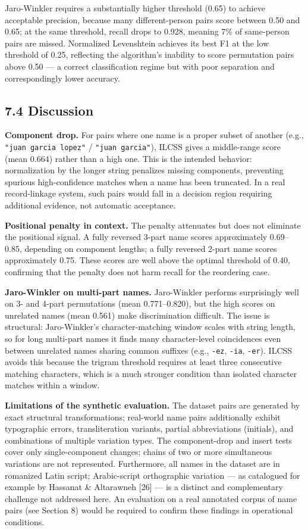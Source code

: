 \documentclass[
  11pt,
]{article}
\begin{document}
Jaro-Winkler requires a substantially higher threshold (0.65) to achieve
acceptable precision, because many different-person pairs score between
0.50 and 0.65; at the same threshold, recall drops to 0.928, meaning 7\%
of same-person pairs are missed. Normalized Levenshtein achieves its
best F1 at the low threshold of 0.25, reflecting the algorithm's
inability to score permutation pairs above 0.50 --- a correct
classification regime but with poor separation and correspondingly lower
accuracy.

\subsection{7.4 Discussion}\label{discussion}

\textbf{Component drop.} For pairs where one name is a proper subset of
another (e.g., \texttt{"juan\ garcia\ lopez"} /
\texttt{"juan\ garcia"}), ILCSS gives a middle-range score (mean 0.664)
rather than a high one. This is the intended behavior: normalization by
the longer string penalizes missing components, preventing spurious
high-confidence matches when a name has been truncated. In a real
record-linkage system, such pairs would fall in a decision region
requiring additional evidence, not automatic acceptance.

\textbf{Positional penalty in context.} The penalty attenuates but does
not eliminate the positional signal. A fully reversed 3-part name scores
approximately 0.69--0.85, depending on component lengths; a fully
reversed 2-part name scores approximately 0.75. These scores are well
above the optimal threshold of 0.40, confirming that the penalty does
not harm recall for the reordering case.

\textbf{Jaro-Winkler on multi-part names.} Jaro-Winkler performs
surprisingly well on 3- and 4-part permutations (mean 0.771--0.820), but
the high scores on unrelated names (mean 0.561) make discrimination
difficult. The issue is structural: Jaro-Winkler's character-matching
window scales with string length, so for long multi-part names it finds
many character-level coincidences even between unrelated names sharing
common suffixes (e.g., \texttt{-ez}, \texttt{-ia}, \texttt{-er}). ILCSS
avoids this because the trigram threshold requires at least three
consecutive matching characters, which is a much stronger condition than
isolated character matches within a window.

\textbf{Limitations of the synthetic evaluation.} The dataset pairs are
generated by exact structural transformations; real-world name pairs
additionally exhibit typographic errors, transliteration variants,
partial abbreviations (initials), and combinations of multiple variation
types. The component-drop and insert tests cover only single-component
changes; chains of two or more simultaneous variations are not
represented. Furthermore, all names in the dataset are in romanized
Latin script; Arabic-script orthographic variation --- as catalogued for
example by Hassanat \& Altarawneh {[}26{]} --- is a distinct and
complementary challenge not addressed here. An evaluation on a real
annotated corpus of name pairs (see Section 8) would be required to
confirm these findings in operational conditions.
\end{document}
